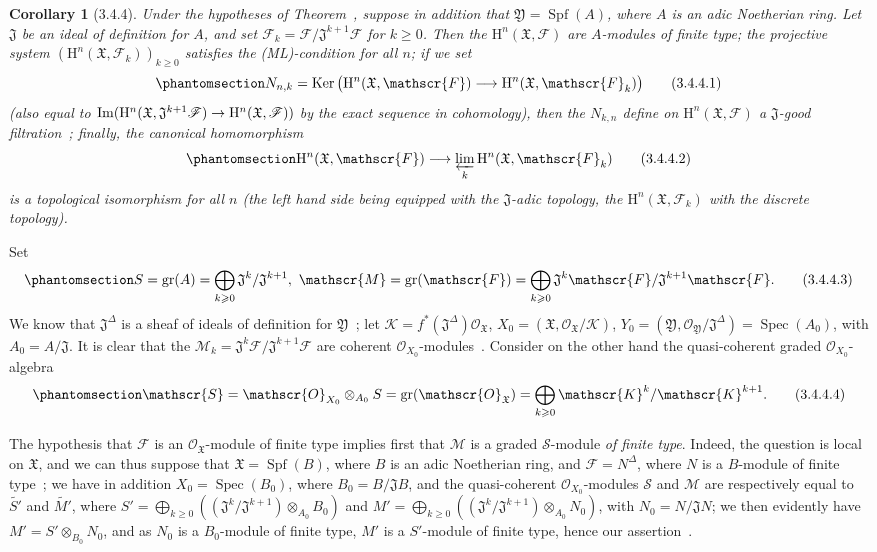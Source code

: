 \documentclass[oneside]{amsart}
\theoremstyle{ega-env-style}
\theoremstyle{ega-thm-env-style}
\newtheorem*{corollary}{Corollary}
\theoremstyle{ega-defn-env-style}
\def\mathcal{\mathscr}
\def\sh{\mathcal}                   %
\def\geq{\geqslant}                 %
\def\HH{\mathrm{H}}                 %
\def\gr{\operatorname{gr}}
\def\Ker{\operatorname{Ker}}
\def\Im{\operatorname{Im}}
\def\Spec{\operatorname{Spec}}
\def\Spf{\operatorname{Spf}}
\renewcommand{\to}{\mathchoice{\longrightarrow}{\rightarrow}{\rightarrow}{\rightarrow}}
\newcommand{\oldpage}[2][]{{\marginnote{\normalfont{\textbf{#1}~|~#2}}}\ignorespaces}
\let\EGAOriginalLabel\label
\renewcommand{\label}[1]{\phantomsection\EGAOriginalLabel{#1}}
\begin{document}
\begin{corollary}[3.4.4]
\label{III.3.4.4}
Under the hypotheses of Theorem~, suppose in addition that $\mathfrak{Y}=\Spf(A)$, where $A$ is an adic Noetherian ring.
Let $\mathfrak{J}$ be an ideal of definition for $A$, and set $\sh{F}_k=\sh{F}/\mathfrak{J}^{k+1}\sh{F}$ for $k\geq 0$.
Then the $\HH^n(\mathfrak{X},\sh{F})$ are $A$-modules of finite type; the projective system $(\HH^n(\mathfrak{X},\sh{F}_k))_{k\geq 0}$ satisfies the \emph{(ML)}-condition for all $n$; if we set
\[
\label{III.3.4.4.1}
  N_{n,k}=\Ker\big(\HH^n(\mathfrak{X},\sh{F})\to\HH^n(\mathfrak{X},\sh{F}_k)\big)
  \tag{3.4.4.1}
\]
(also equal to $\Im(\HH^n(\mathfrak{X},\mathfrak{J}^{k+1}\sh{F})\to\HH^n(\mathfrak{X},\sh{F}))$ by the exact sequence in cohomology), then the $N_{k,n}$ define on $\HH^n(\mathfrak{X},\sh{F})$ a $\mathfrak{J}$-good filtration~; finally, the canonical homomorphism
\[
\label{III.3.4.4.2}
  \HH^n(\mathfrak{X},\sh{F})\to\varprojlim_k\HH^n(\mathfrak{X},\sh{F}_k)
  \tag{3.4.4.2}
\]
is a topological isomorphism for all $n$ (the left hand side being equipped with the $\mathfrak{J}$-adic topology, the $\HH^n(\mathfrak{X},\sh{F}_k)$ with the discrete topology).
\end{corollary}

Set
\[
\label{III.3.4.4.3}
  S=\gr(A)=\bigoplus_{k\geq 0}\mathfrak{J}^k/\mathfrak{J}^{k+1},\ \sh{M}=\gr(\sh{F})=\bigoplus_{k\geq 0}\mathfrak{J}^k\sh{F}/\mathfrak{J}^{k+1}\sh{F}. \tag{3.4.4.3}
\]
We know that $\mathfrak{J}^\Delta$ is a sheaf of ideals of definition for $\mathfrak{Y}$~; let $\sh{K}=f^*(\mathfrak{J}^\Delta)\sh{O}_\mathfrak{X}$, $X_0=(\mathfrak{X},\sh{O}_\mathfrak{X}/\sh{K})$, $Y_0=(\mathfrak{Y},\sh{O}_\mathfrak{Y}/\mathfrak{J}^\Delta)=\Spec(A_0)$, with $A_0=A/\mathfrak{J}$.
It is clear that the $\sh{M}_k=\mathfrak{J}^k\sh{F}/\mathfrak{J}^{k+1}\sh{F}$ are coherent $\sh{O}_{X_0}$-modules~.
Consider on the other hand the quasi-coherent graded $\sh{O}_{X_0}$-algebra
\[
\label{III.3.4.4.4}
  \sh{S}=\sh{O}_{X_0}\otimes_{A_0}S=\gr(\sh{O}_\mathfrak{X})=\bigoplus_{k\geq 0}\sh{K}^k/\sh{K}^{k+1}.
  \tag{3.4.4.4}
\]

The hypothesis that $\sh{F}$ is an $\sh{O}_\mathfrak{X}$-module of finite type implies first that $\sh{M}$ is
\oldpage[III]{121}
a graded $\sh{S}$-module \emph{of finite type}.
Indeed, the question is local on $\mathfrak{X}$, and we can thus suppose that $\mathfrak{X}=\Spf(B)$, where $B$ is an adic Noetherian ring, and $\sh{F}=N^\Delta$, where $N$ is a $B$-module of finite type~; we have in addition $X_0=\Spec(B_0)$, where $B_0=B/\mathfrak{J}B$, and the quasi-coherent $\sh{O}_{X_0}$-modules $\sh{S}$ and $\sh{M}$ are respectively equal to $\widetilde{S'}$ and $\widetilde{M'}$, where $S'=\bigoplus_{k\geq 0}((\mathfrak{J}^k/\mathfrak{J}^{k+1})\otimes_{A_0}B_0)$ and $M'=\bigoplus_{k\geq 0}((\mathfrak{J}^k/\mathfrak{J}^{k+1})\otimes_{A_0}N_0)$, with $N_0=N/\mathfrak{J}N$; we then evidently have $M'=S'\otimes_{B_0}N_0$, and as $N_0$ is a $B_0$-module of finite type, $M'$ is a $S'$-module of finite type, hence our assertion~.
\end{document}
